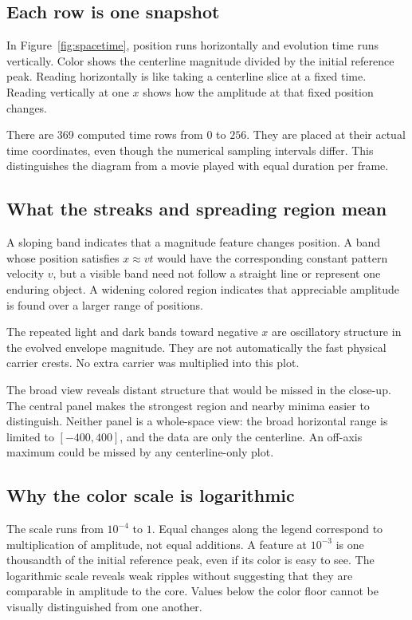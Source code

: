 \documentclass[10pt]{article}
\begin{document}
\subsection{Each row is one snapshot}
In Figure~\ref{fig:spacetime}, position runs horizontally and evolution time runs vertically. Color shows the centerline magnitude divided by the initial reference peak. Reading horizontally is like taking a centerline slice at a fixed time. Reading vertically at one $x$ shows how the amplitude at that fixed position changes.

There are 369 computed time rows from $0$ to $256$. They are placed at their actual time coordinates, even though the numerical sampling intervals differ. This distinguishes the diagram from a movie played with equal duration per frame.

\subsection{What the streaks and spreading region mean}
A sloping band indicates that a magnitude feature changes position. A band whose position satisfies $x\approx vt$ would have the corresponding constant pattern velocity $v$, but a visible band need not follow a straight line or represent one enduring object. A widening colored region indicates that appreciable amplitude is found over a larger range of positions.

The repeated light and dark bands toward negative $x$ are oscillatory structure in the evolved envelope magnitude. They are not automatically the fast physical carrier crests. No extra carrier was multiplied into this plot.

The broad view reveals distant structure that would be missed in the close-up. The central panel makes the strongest region and nearby minima easier to distinguish. Neither panel is a whole-space view: the broad horizontal range is limited to $[-400,400]$, and the data are only the centerline. An off-axis maximum could be missed by any centerline-only plot.

\subsection{Why the color scale is logarithmic}
The scale runs from $10^{-4}$ to $1$. Equal changes along the legend correspond to multiplication of amplitude, not equal additions. A feature at $10^{-3}$ is one thousandth of the initial reference peak, even if its color is easy to see. The logarithmic scale reveals weak ripples without suggesting that they are comparable in amplitude to the core. Values below the color floor cannot be visually distinguished from one another.
\end{document}
